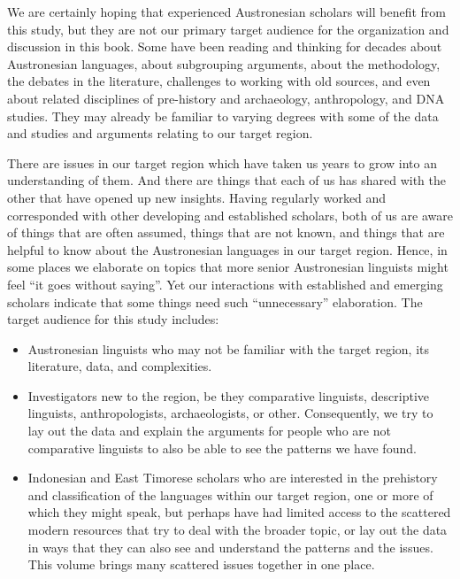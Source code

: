 We are certainly hoping that experienced Austronesian scholars will benefit from this study,
but they are not our primary target audience for the organization
and discussion in this book.
Some have been reading
and thinking for decades about Austronesian languages,
about subgrouping arguments,
about the methodology,
the debates in the literature,
challenges to working with old sources,
and even about related disciplines of pre-history
and archaeology, anthropology, and DNA studies.
They may already be familiar to varying degrees with some of the data
and studies and arguments relating to our target region.

There are issues in our target region
which have taken us years to grow into an understanding of them.
And there are things that each of us has shared with the other that have opened up new insights.
Having regularly worked
and corresponded with other developing
and established scholars,
both of us are aware of things that are often assumed,
things that are not known,
and things that are helpful to know about the Austronesian languages in our target region.
Hence, in some places we elaborate on topics
that more senior Austronesian linguists might feel “it goes without saying”.
Yet our interactions with established
and emerging scholars indicate that some things need such “unnecessary” elaboration.
The target audience for this study includes:

\begin{itemize}
	\item Austronesian linguists who may not be familiar with the target region,
				its literature, data, and complexities.
	\item Investigators new to the region,
				be they comparative linguists,
				descriptive linguists, anthropologists, archaeologists, or other.
				Consequently, we try to lay out the data
				and explain the arguments for people who are not comparative linguists to also be able to see the patterns we have found.
	\item Indonesian and East Timorese scholars who are interested in the prehistory
				and classification of the languages within our target region,
				one or more of which they might speak,
				but perhaps have had limited access to the scattered modern resources that try to deal with the broader topic,
				or lay out the data in ways that they can also see
				and understand the patterns
				and the issues.
				This volume brings many scattered issues together in one place.
\end{itemize}

